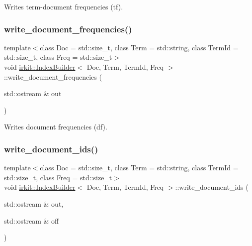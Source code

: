 Writes term-\/document frequencies (tf). 

\mbox{\label{classirkit_1_1IndexBuilder_a57c15d23588f70b78b49a6392ef61be8}} 
\subsubsection{\texorpdfstring{write\+\_\+document\+\_\+frequencies()}{write\_document\_frequencies()}}
{\footnotesize\ttfamily template$<$class Doc  = std\+::size\+\_\+t, class Term  = std\+::string, class Term\+Id  = std\+::size\+\_\+t, class Freq  = std\+::size\+\_\+t$>$ \\
void \hyperlink{classirkit_1_1IndexBuilder}{irkit\+::\+Index\+Builder}$<$ Doc, Term, Term\+Id, Freq $>$\+::write\+\_\+document\+\_\+frequencies (\begin{DoxyParamCaption}\item[{std\+::ostream \&}]{out }\end{DoxyParamCaption})\hspace{0.3cm}{\ttfamily [inline]}}



Writes document frequencies (df). 

\mbox{\label{classirkit_1_1IndexBuilder_af8d8c6c446a064ec7c9b2a05b522555e}} 
\subsubsection{\texorpdfstring{write\+\_\+document\+\_\+ids()}{write\_document\_ids()}}
{\footnotesize\ttfamily template$<$class Doc  = std\+::size\+\_\+t, class Term  = std\+::string, class Term\+Id  = std\+::size\+\_\+t, class Freq  = std\+::size\+\_\+t$>$ \\
void \hyperlink{classirkit_1_1IndexBuilder}{irkit\+::\+Index\+Builder}$<$ Doc, Term, Term\+Id, Freq $>$\+::write\+\_\+document\+\_\+ids (\begin{DoxyParamCaption}\item[{std\+::ostream \&}]{out,  }\item[{std\+::ostream \&}]{off }\end{DoxyParamCaption})\hspace{0.3cm}{\ttfamily [inline]}}




